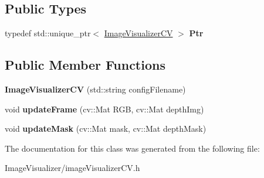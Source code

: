 \subsection*{Public Types}
\begin{DoxyCompactItemize}
\item 
typedef std\+::unique\+\_\+ptr$<$ \hyperlink{classImageVisualizerCV}{Image\+Visualizer\+CV} $>$ {\bfseries Ptr}\hypertarget{classImageVisualizerCV_af7f61a02a93798de851168eb425e900a}{}\label{classImageVisualizerCV_af7f61a02a93798de851168eb425e900a}

\end{DoxyCompactItemize}
\subsection*{Public Member Functions}
\begin{DoxyCompactItemize}
\item 
{\bfseries Image\+Visualizer\+CV} (std\+::string config\+Filename)\hypertarget{classImageVisualizerCV_a4adc88688d2f60c8e0d5e982a2838e79}{}\label{classImageVisualizerCV_a4adc88688d2f60c8e0d5e982a2838e79}

\item 
void {\bfseries update\+Frame} (cv\+::\+Mat R\+GB, cv\+::\+Mat depth\+Img)\hypertarget{classImageVisualizerCV_aa6c48302a07250be5fd8c988547510b7}{}\label{classImageVisualizerCV_aa6c48302a07250be5fd8c988547510b7}

\item 
void {\bfseries update\+Mask} (cv\+::\+Mat mask, cv\+::\+Mat depth\+Mask)\hypertarget{classImageVisualizerCV_a0571545cb7ac7ce7788f36d163028ee1}{}\label{classImageVisualizerCV_a0571545cb7ac7ce7788f36d163028ee1}

\end{DoxyCompactItemize}


The documentation for this class was generated from the following file\+:\begin{DoxyCompactItemize}
\item 
Image\+Visualizer/image\+Visualizer\+C\+V.\+h\end{DoxyCompactItemize}
